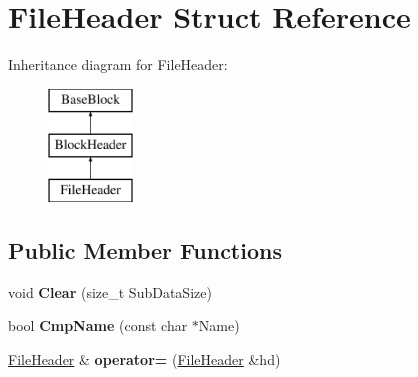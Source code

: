 \hypertarget{struct_file_header}{\section{File\-Header Struct Reference}
\label{struct_file_header}
}
Inheritance diagram for File\-Header\-:\begin{figure}[H]
\begin{center}
\leavevmode
\includegraphics[height=3.000000cm]{struct_file_header}
\end{center}
\end{figure}
\subsection*{Public Member Functions}
\begin{DoxyCompactItemize}
\item 
\hypertarget{struct_file_header_a07a6fb68bc0122a2d062cbd510ee3a8c}{void {\bfseries Clear} (size\-\_\-t Sub\-Data\-Size)}\label{struct_file_header_a07a6fb68bc0122a2d062cbd510ee3a8c}

\item 
\hypertarget{struct_file_header_ad889a34882f468cf57a472b4d7357916}{bool {\bfseries Cmp\-Name} (const char $\ast$Name)}\label{struct_file_header_ad889a34882f468cf57a472b4d7357916}

\item 
\hypertarget{struct_file_header_a30611ab983d5982b3720f0f297f5205c}{\hyperlink{struct_file_header}{File\-Header} \& {\bfseries operator=} (\hyperlink{struct_file_header}{File\-Header} \&hd)}\label{struct_file_header_a30611ab983d5982b3720f0f297f5205c}

\end{DoxyCompactItemize}
